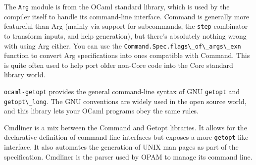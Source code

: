 \begin{description}
\tightlist
\item[The \texttt{Arg} module]
The \passthrough{\lstinline!Arg!} module is from the OCaml standard
library, which is used by the compiler itself to handle its command-line
interface. Command is generally more featureful than Arg (mainly via
support for subcommands, the \passthrough{\lstinline!step!} combinator
to transform inputs, and help generation), but there's absolutely
nothing wrong with using Arg either. You can use the
\passthrough{\lstinline!Command.Spec.flags\_of\_args\_exn!} function to
convert Arg specifications into ones compatible with Command. This is
quite often used to help port older non-Core code into the Core standard
library world.
\item[\href{https://forge.ocamlcore.org/projects/ocaml-getopt/}{ocaml-getopt}]
\passthrough{\lstinline!ocaml-getopt!} provides the general command-line
syntax of GNU \passthrough{\lstinline!getopt!} and
\passthrough{\lstinline!getopt\_long!}. The GNU conventions are widely
used in the open source world, and this library lets your OCaml programs
obey the same rules.
\item[\href{http://erratique.ch/software/cmdliner}{Cmdliner}]
Cmdliner is a mix between the Command and Getopt libraries. It allows
for the declarative definition of command-line interfaces but exposes a
more \passthrough{\lstinline!getopt!}-like interface. It also automates
the generation of UNIX man pages as part of the specification. Cmdliner
is the parser used by OPAM to manage its command line.
\end{description}
